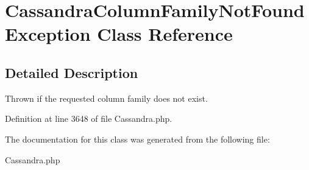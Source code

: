 \hypertarget{classCassandraColumnFamilyNotFoundException}{
\section{CassandraColumnFamilyNotFoundException Class Reference}
\label{classCassandraColumnFamilyNotFoundException}
}


\subsection{Detailed Description}
Thrown if the requested column family does not exist. 

Definition at line 3648 of file Cassandra.php.



The documentation for this class was generated from the following file:\begin{DoxyCompactItemize}
\item 
Cassandra.php\end{DoxyCompactItemize}
